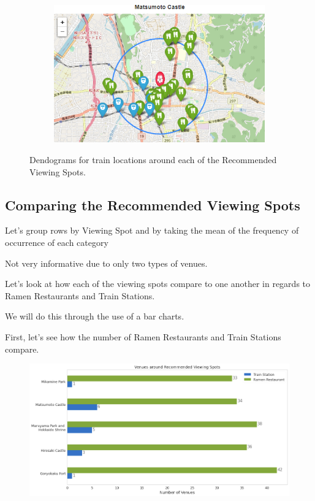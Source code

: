 \documentclass[11pt]{article}
\begin{document}
\begin{figure}[H]
  \vfill
  \begin{subfigure}[b]{0.45\textwidth}
    \centering
    \includegraphics[width=\textwidth]{images/Matsumoto Castle_venues.png}
  \end{subfigure}
  \caption{Dendograms for train locations around each of the Recommended Viewing Spots.}
\end{figure}
        
    \hypertarget{comparing-the-recommended-viewing-spots}{%
\subsection{Comparing the Recommended Viewing
Spots}\label{comparing-the-recommended-viewing-spots}}

    Let's group rows by Viewing Spot and by taking the mean of the frequency
of occurrence of each category


        
    Not very informative due to only two types of venues.

Let's look at how each of the viewing spots compare to one another in
regards to Ramen Restaurants and Train Stations.

We will do this through the use of a bar charts.

First, let's see how the number of Ramen Restaurants and Train Stations
compare.

\begin{figure}[H]
  \centering
  \includegraphics[]{images/Venue_Count.png}
  \caption{}
\end{figure}
\end{document}
